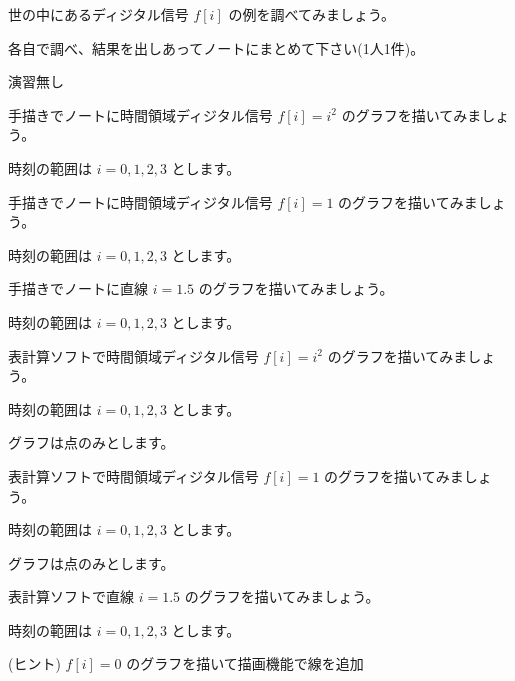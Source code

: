 \documentclass[a4paper]{jarticle}
\begin{document}


 世の中にあるディジタル信号 $f[i]$ の例を調べてみましょう。\par
\noindent 各自で調べ、結果を出しあってノートにまとめて下さい(1人1件)。


\vspace{2zh}
\noindent 演習無し


 手描きでノートに時間領域ディジタル信号 $f[i] = i^2$ のグラフを描いてみましょう。\par
\noindent 時刻の範囲は $i = 0,1,2,3$ とします。

 手描きでノートに時間領域ディジタル信号 $f[i] = 1$ のグラフを描いてみましょう。\par
\noindent 時刻の範囲は $i = 0,1,2,3$ とします。

 手描きでノートに直線 $i = 1.5$ のグラフを描いてみましょう。\par
\noindent 時刻の範囲は $i = 0,1,2,3$ とします。

 表計算ソフトで時間領域ディジタル信号 $f[i] = i^2$ のグラフを描いてみましょう。\par
\noindent 時刻の範囲は $i = 0,1,2,3$ とします。\par
\noindent グラフは点のみとします。

 表計算ソフトで時間領域ディジタル信号 $f[i] = 1$ のグラフを描いてみましょう。\par
\noindent 時刻の範囲は $i = 0,1,2,3$ とします。\par
\noindent グラフは点のみとします。

 表計算ソフトで直線 $i = 1.5$ のグラフを描いてみましょう。\par
\noindent 時刻の範囲は $i = 0,1,2,3$ とします。\par
\noindent (ヒント) $f[i] = 0$ のグラフを描いて描画機能で線を追加

\savepractime
\end{document}
